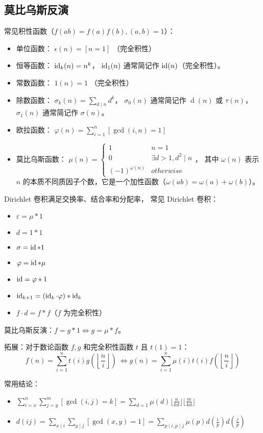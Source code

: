 \subsection{莫比乌斯反演}
常见积性函数（$f(ab) = f(a)f(b), (a, b) = 1$）：
\begin{itemize}
\item 单位函数：
  $\epsilon(n)=[n=1]$ （完全积性）
\item 恒等函数：
  $\operatorname{id}_{k}(n)=n^k$，
  $\operatorname{id}_{1}(n)$ 通常简记作 $\operatorname{id}(n)$（完全积性）。
\item 常数函数：
  $1(n)=1$ （完全积性）
\item 除数函数：
  $\sigma_{k}(n)=\sum_{d\mid n}d^{k}$，
  $\sigma_{0}(n)$ 通常简记作 $\operatorname{d}(n)$ 或 $\tau(n)$，
  $\sigma_{1}(n)$ 通常简记作 $\sigma(n)$。
\item 欧拉函数：
  $\varphi(n)=\sum_{i=1}^n [\gcd(i,n)=1]$
\item 莫比乌斯函数：
  $\mu(n) = \begin{cases}1 & n=1 \\ 0 & \exists d>1,d^{2} \mid n \\ {(-1)}^{\omega(n)} & otherwise \end{cases}$，
  其中 $\omega(n)$ 表示 $n$ 的本质不同质因子个数，它是一个加性函数（$\omega(ab) = \omega(a) + \omega(b)$）。
\end{itemize}

Dirichlet 卷积满足交换率、结合率和分配率，
常见 Dirichlet 卷积：
\begin{multicols}{3}
  \begin{itemize}
  \item $\varepsilon = \mu \ast 1$
  \item $d = 1 \ast 1$
  \item $\sigma = \operatorname{id} \ast 1$
  \item $\varphi = \operatorname{id} \ast \mu$
  \item $\operatorname{id} = \varphi \ast 1$
  \item $\operatorname{id}_{k + 1} = (\operatorname{id}_{k} \cdot \varphi) \ast \operatorname{id}_{k}$
  \item $f \cdot d = f \ast f$（$f$ 为完全积性）
  \end{itemize}
\end{multicols}

莫比乌斯反演：$f = g \ast 1 \iff g = \mu \ast f$。

拓展：对于数论函数 $f,g$ 和完全积性函数 $t$ 且 $t(1)=1$：
\[ f(n)=\sum_{i=1}^n t(i)g\left(\left\lfloor\frac{n}{i}\right\rfloor\right)\ \iff g(n)=\sum_{i=1}^n\mu(i)t(i)f\left(\left\lfloor\frac{n}{i}\right\rfloor\right) \]

常用结论：
\begin{itemize}
\item $ \sum_{i=x}^{n}\sum_{j=y}^{m}[\gcd(i,j)=k] = \sum_{d=1}\mu(d)\lfloor\frac{n}{kd}\rfloor\lfloor\frac{m}{kd}\rfloor $
\item $ d(ij) = \sum_{x \mid i}\sum_{y \mid j} [\gcd(x, y) = 1] = \sum_{p \mid i,p \mid j}\mu(p)d\left(\frac{i}{p}\right)d\left(\frac{j}{p}\right) $
\end{itemize}